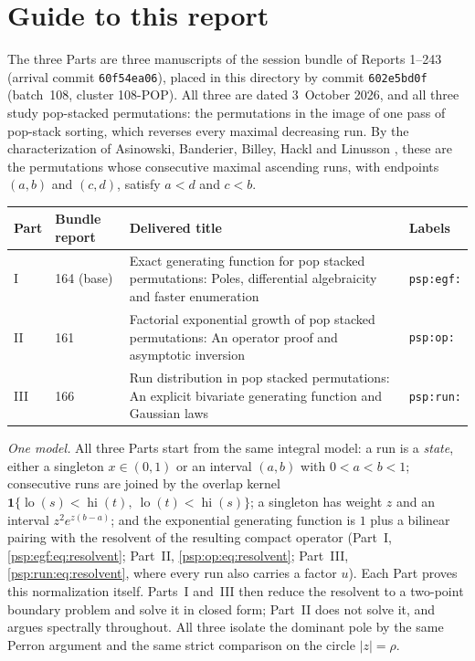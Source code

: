 \documentclass[11pt,letterpaper]{article}
\numberwithin{equation}{section}
\theoremstyle{remark}\newtheorem{remark}[theorem]{Remark}
\newcommand{\one}{\mathbf1}
\newcommand{\lo}{\operatorname{lo}}
\newcommand{\hi}{\operatorname{hi}}
\begin{document}
\section*{Guide to this report}\label{psp:sec:guide}
The three Parts are three manuscripts of the session bundle of Reports 1--243 (arrival commit \texttt{60f54ea06}), placed in this directory by commit \texttt{602e5bd0f} (batch~108, cluster 108-POP). All three are dated 3~October 2026, and all three study pop-stacked permutations: the permutations in the image of one pass of pop-stack sorting, which reverses every maximal decreasing run. By the characterization of Asinowski, Banderier, Billey, Hackl and Linusson \cite{abbhl,abh}, these are the permutations whose consecutive maximal ascending runs, with endpoints $(a,b)$ and $(c,d)$, satisfy $a<d$ and $c<b$.
\begin{center}
\small
\begin{tabular}{@{}l l >{\raggedright\arraybackslash}p{} l@{}}
\toprule
Part & Bundle report & Delivered title & Labels\\
\midrule
I & 164 (base) & Exact generating function for pop stacked permutations: Poles, differential algebraicity and faster enumeration & \texttt{psp:egf:}\\
II & 161 & Factorial exponential growth of pop stacked permutations: An operator proof and asymptotic inversion & \texttt{psp:op:}\\
III & 166 & Run distribution in pop stacked permutations: An explicit bivariate generating function and Gaussian laws & \texttt{psp:run:}\\
\bottomrule
\end{tabular}
\end{center}
\emph{One model.} All three Parts start from the same integral model: a run is a \emph{state}, either a singleton $x\in(0,1)$ or an interval $(a,b)$ with $0<a<b<1$; consecutive runs are joined by the overlap kernel $\one\{\lo(s)<\hi(t),\ \lo(t)<\hi(s)\}$; a singleton has weight $z$ and an interval $z^2e^{z(b-a)}$; and the exponential generating function is $1$ plus a bilinear pairing with the resolvent of the resulting compact operator (Part~I, \eqref{psp:egf:eq:resolvent}; Part~II, \eqref{psp:op:eq:resolvent}; Part~III, \eqref{psp:run:eq:resolvent}, where every run also carries a factor $u$). Each Part proves this normalization itself. Parts~I and~III then reduce the resolvent to a two-point boundary problem and solve it in closed form; Part~II does not solve it, and argues spectrally throughout. All three isolate the dominant pole by the same Perron argument and the same strict comparison on the circle $|z|=\rho$.
\end{document}
